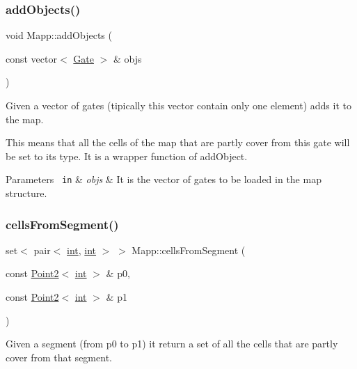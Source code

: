 \subsubsection{\texorpdfstring{addObjects()}{addObjects()}\hspace{0.1cm}{\footnotesize\ttfamily [4/4]}}
{\footnotesize\ttfamily void Mapp\+::add\+Objects (\begin{DoxyParamCaption}\item[{const vector$<$ \mbox{\hyperlink{class_gate}{Gate}} $>$ \&}]{objs }\end{DoxyParamCaption})}



Given a vector of gates (tipically this vector contain only one element) adds it to the map. 

This means that all the cells of the map that are partly cover from this gate will be set to its type. It is a wrapper function of add\+Object.


\begin{DoxyParams}[1]{Parameters}
\mbox{\texttt{ in}}  & {\em objs} & It is the vector of gates to be loaded in the map structure. \\
\hline
\end{DoxyParams}
\mbox{\label{class_mapp_a934e0d553769c2735e6193d1b43ddf87}} 
\subsubsection{\texorpdfstring{cellsFromSegment()}{cellsFromSegment()}}
{\footnotesize\ttfamily set$<$ pair$<$ \mbox{\hyperlink{draw_8hh_aa620a13339ac3a1177c86edc549fda9b}{int}}, \mbox{\hyperlink{draw_8hh_aa620a13339ac3a1177c86edc549fda9b}{int}} $>$ $>$ Mapp\+::cells\+From\+Segment (\begin{DoxyParamCaption}\item[{const \mbox{\hyperlink{class_point2}{Point2}}$<$ \mbox{\hyperlink{draw_8hh_aa620a13339ac3a1177c86edc549fda9b}{int}} $>$ \&}]{p0,  }\item[{const \mbox{\hyperlink{class_point2}{Point2}}$<$ \mbox{\hyperlink{draw_8hh_aa620a13339ac3a1177c86edc549fda9b}{int}} $>$ \&}]{p1 }\end{DoxyParamCaption})\hspace{0.3cm}{\ttfamily [protected]}}



Given a segment (from p0 to p1) it return a set of all the cells that are partly cover from that segment. 


